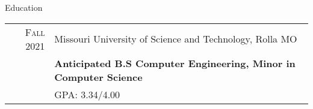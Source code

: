\documentclass{resume}
\begin{document}


\begin{rSection}{Education}
    \small
    {
        \begin{tabular}{r|p{15cm}}
            \textsc{Fall} 2021 & Missouri University of Science and Technology, Rolla MO  \\
                              & \textbf{Anticipated B.S Computer Engineering, Minor in Computer Science} \\
                              & GPA: 3.34/4.00 \\
        \end{tabular}
    }
\end{rSection}
\end{document}
